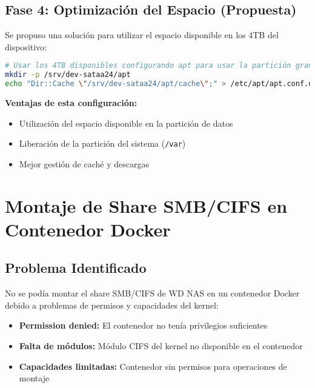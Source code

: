 \documentclass[12pt, a4paper]{article}
\begin{document}
\subsection{Fase 4: Optimización del Espacio (Propuesta)}
\label{subsec:optimizacion_espacio}

Se propuso una solución para utilizar el espacio disponible en los 4TB del dispositivo:

\begin{lstlisting}[language=bash, caption=Optimización del uso de espacio]
# Usar los 4TB disponibles configurando apt para usar la partición grande
mkdir -p /srv/dev-sataa24/apt
echo "Dir::Cache \"/srv/dev-sataa24/apt/cache\";" > /etc/apt/apt.conf.d/70bigdisk
\end{lstlisting}

\textbf{Ventajas de esta configuración:}
\begin{itemize}
    \item Utilización del espacio disponible en la partición de datos
    \item Liberación de la partición del sistema (\texttt{/var})
    \item Mejor gestión de caché y descargas
\end{itemize}

\clearpage

\section{Montaje de Share SMB/CIFS en Contenedor Docker}
\label{sec:montaje_docker}

\subsection{Problema Identificado}
\label{subsec:problema_montaje}

No se podía montar el share SMB/CIFS de WD NAS en un contenedor Docker debido a problemas de permisos y capacidades del kernel:

\begin{itemize}
    \item \textbf{Permission denied:} El contenedor no tenía privilegios suficientes
    \item \textbf{Falta de módulos:} Módulo CIFS del kernel no disponible en el contenedor
    \item \textbf{Capacidades limitadas:} Contenedor sin permisos para operaciones de montaje
\end{itemize}
\end{document}
